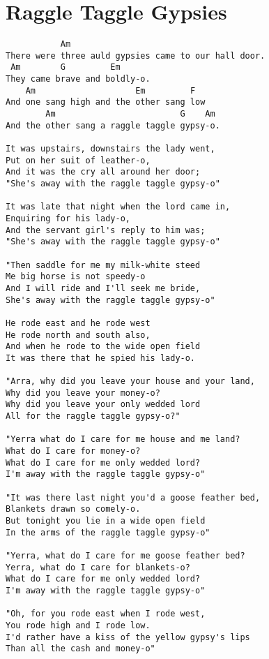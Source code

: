 \documentclass[leqno]{memoir}
\begin{document}
\chapter{Raggle Taggle Gypsies}
\begin{verbatim}
           Am
There were three auld gypsies came to our hall door.
 Am        G         Em   
They came brave and boldly-o.
    Am                    Em         F
And one sang high and the other sang low
        Am                         G    Am
And the other sang a raggle taggle gypsy-o.
 
It was upstairs, downstairs the lady went,
Put on her suit of leather-o,
And it was the cry all around her door;
"She's away with the raggle taggle gypsy-o"
 
It was late that night when the lord came in,
Enquiring for his lady-o,
And the servant girl's reply to him was;
"She's away with the raggle taggle gypsy-o"
 
"Then saddle for me my milk-white steed
Me big horse is not speedy-o
And I will ride and I'll seek me bride,
She's away with the raggle taggle gypsy-o"
 
He rode east and he rode west
He rode north and south also,
And when he rode to the wide open field
It was there that he spied his lady-o.
 
"Arra, why did you leave your house and your land,
Why did you leave your money-o?
Why did you leave your only wedded lord
All for the raggle taggle gypsy-o?"
 
"Yerra what do I care for me house and me land?
What do I care for money-o?
What do I care for me only wedded lord?
I'm away with the raggle taggle gypsy-o"
 
"It was there last night you'd a goose feather bed,
Blankets drawn so comely-o.
But tonight you lie in a wide open field
In the arms of the raggle taggle gypsy-o"
 
"Yerra, what do I care for me goose feather bed?
Yerra, what do I care for blankets-o?
What do I care for me only wedded lord?
I'm away with the raggle taggle gypsy-o"
 
"Oh, for you rode east when I rode west,
You rode high and I rode low.
I'd rather have a kiss of the yellow gypsy's lips
Than all the cash and money-o"

\end{verbatim}
\newpage
\end{document}
